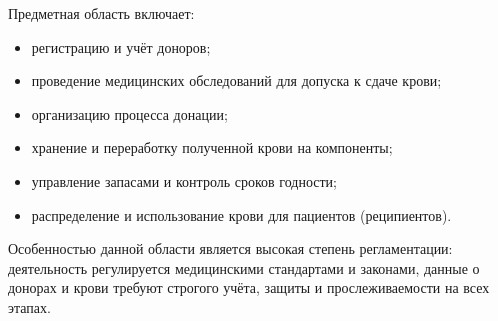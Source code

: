\documentclass[a4paper,12pt]{article}
\begin{document}
Предметная область включает:

\begin{itemize}
  \item регистрацию и учёт доноров;
  \item проведение медицинских обследований для допуска к сдаче крови;
  \item организацию процесса донации;
  \item хранение и переработку полученной крови на компоненты;
  \item управление запасами и контроль сроков годности;
  \item распределение и использование крови для пациентов (реципиентов).
\end{itemize}

Особенностью данной области является высокая степень регламентации: 
деятельность регулируется медицинскими стандартами и законами, данные о 
донорах и крови требуют строгого учёта, защиты и прослеживаемости на всех 
этапах.



\end{document}
